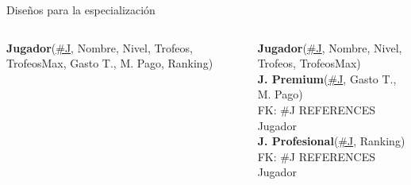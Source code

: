 \begin{frame}{Dise\~nos para la especializaci\'on}
    \begin{columns}[T]
        \begin{column}{0.48\linewidth}

            \begin{scriptsize}
                
                \textbf{Jugador}(\underline{\#J}, Nombre, Nivel, Trofeos, TrofeosMax, Gasto T., M. Pago, Ranking)\\[2mm]
            \end{scriptsize}
        \end{column}

        \begin{column}{0.48\linewidth}
            \begin{scriptsize}
                
                \textbf{Jugador}(\underline{\#J}, Nombre, Nivel, Trofeos, TrofeosMax)\\[2mm]
                \textbf{J. Premium}(\underline{\#J}, Gasto T., M. Pago)\\[1mm]
                \hspace{4mm} FK: \#J REFERENCES Jugador\\[2mm]
                \textbf{J. Profesional}(\underline{\#J}, Ranking)\\[1mm]
                \hspace{4mm} FK: \#J REFERENCES Jugador
            \end{scriptsize}
        \end{column}
        
    \end{columns}

\end{frame}



